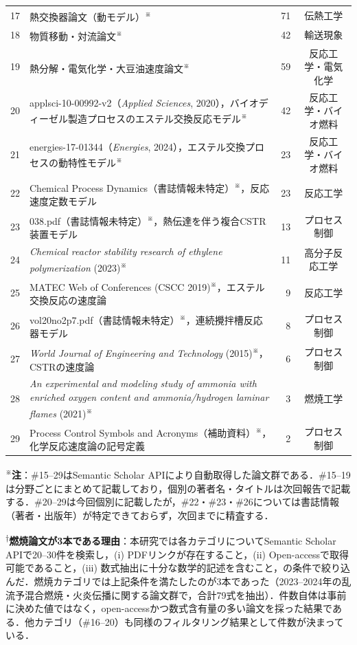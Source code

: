 \documentclass[11pt,a4paper]{ltjsarticle}
\begin{document}
\begin{longtable}{clrc}
17 & 熱交換器論文（動モデル）\textsuperscript{※} & 71 & 伝熱工学 \\
18 & 物質移動・対流論文\textsuperscript{※} & 42 & 輸送現象 \\
19 & 熱分解・電気化学・大豆油速度論文\textsuperscript{※} & 59 & 反応工学・電気化学 \\
20 & applsci-10-00992-v2（\textit{Applied Sciences}, 2020），バイオディーゼル製造プロセスのエステル交換反応モデル\textsuperscript{※} & 42 & 反応工学・バイオ燃料 \\
21 & energies-17-01344（\textit{Energies}, 2024），エステル交換プロセスの動特性モデル\textsuperscript{※} & 23 & 反応工学・バイオ燃料 \\
22 & Chemical Process Dynamics（書誌情報未特定）\textsuperscript{※}，反応速度定数モデル & 23 & 反応工学 \\
23 & 038.pdf（書誌情報未特定）\textsuperscript{※}，熱伝達を伴う複合CSTR装置モデル & 13 & プロセス制御 \\
24 & \textit{Chemical reactor stability research of ethylene polymerization} (2023)\textsuperscript{※} & 11 & 高分子反応工学 \\
25 & MATEC Web of Conferences (CSCC 2019)\textsuperscript{※}，エステル交換反応の速度論 & 9 & 反応工学 \\
26 & vol20no2p7.pdf（書誌情報未特定）\textsuperscript{※}，連続攪拌槽反応器モデル & 8 & プロセス制御 \\
27 & \textit{World Journal of Engineering and Technology} (2015)\textsuperscript{※}，CSTRの速度論 & 6 & プロセス制御 \\
28 & \textit{An experimental and modeling study of ammonia with enriched oxygen content and ammonia/hydrogen laminar flames} (2021)\textsuperscript{※} & 3 & 燃焼工学 \\
29 & Process Control Symbols and Acronyms（補助資料）\textsuperscript{※}，化学反応速度論の記号定義 & 2 & プロセス制御 \\
\bottomrule
\end{longtable}

\noindent\textsuperscript{※}\textbf{注}：\#15--29はSemantic Scholar APIにより自動取得した論文群である．\#15--19は分野ごとにまとめて記載しており，個別の著者名・タイトルは次回報告で記載する．\#20--29は今回個別に記載したが，\#22・\#23・\#26については書誌情報（著者・出版年）が特定できておらず，次回までに精査する．

\noindent\textsuperscript{†}\textbf{燃焼論文が3本である理由}：本研究では各カテゴリについてSemantic Scholar APIで20--30件を検索し，(i) PDFリンクが存在すること，(ii) Open-accessで取得可能であること，(iii) 数式抽出に十分な数学的記述を含むこと，の条件で絞り込んだ．燃焼カテゴリでは上記条件を満たしたのが3本であった（2023--2024年の乱流予混合燃焼・火炎伝播に関する論文群で，合計79式を抽出）．件数自体は事前に決めた値ではなく，open-accessかつ数式含有量の多い論文を採った結果である．他カテゴリ（\#16--20）も同様のフィルタリング結果として件数が決まっている．
\end{document}
